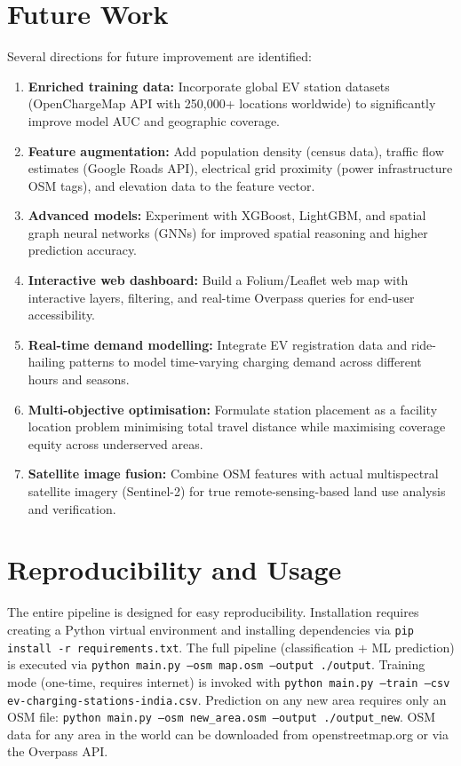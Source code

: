 \documentclass[conference]{IEEEtran}
\begin{document}
\section{Future Work}

Several directions for future improvement are identified:

\begin{enumerate}
\item \textbf{Enriched training data:} Incorporate global EV station datasets (OpenChargeMap API with 250,000+ locations worldwide) to significantly improve model AUC and geographic coverage.

\item \textbf{Feature augmentation:} Add population density (census data), traffic flow estimates (Google Roads API), electrical grid proximity (power infrastructure OSM tags), and elevation data to the feature vector.

\item \textbf{Advanced models:} Experiment with XGBoost, LightGBM, and spatial graph neural networks (GNNs) for improved spatial reasoning and higher prediction accuracy.

\item \textbf{Interactive web dashboard:} Build a Folium/Leaflet web map with interactive layers, filtering, and real-time Overpass queries for end-user accessibility.

\item \textbf{Real-time demand modelling:} Integrate EV registration data and ride-hailing patterns to model time-varying charging demand across different hours and seasons.

\item \textbf{Multi-objective optimisation:} Formulate station placement as a facility location problem minimising total travel distance while maximising coverage equity across underserved areas.

\item \textbf{Satellite image fusion:} Combine OSM features with actual multispectral satellite imagery (Sentinel-2) for true remote-sensing-based land use analysis and verification.
\end{enumerate}


\section{Reproducibility and Usage}

The entire pipeline is designed for easy reproducibility. Installation requires creating a Python virtual environment and installing dependencies via \texttt{pip install -r requirements.txt}. The full pipeline (classification + ML prediction) is executed via \texttt{python main.py --osm map.osm --output ./output}. Training mode (one-time, requires internet) is invoked with \texttt{python main.py --train --csv ev-charging-stations-india.csv}. Prediction on any new area requires only an OSM file: \texttt{python main.py --osm new\_area.osm --output ./output\_new}. OSM data for any area in the world can be downloaded from openstreetmap.org or via the Overpass API.
\end{document}
